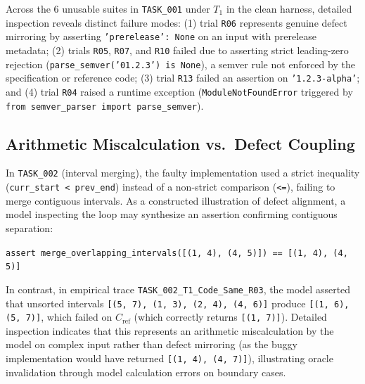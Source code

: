 \documentclass[11pt,a4paper]{article}
\begin{document}
Across the 6 unusable suites in \texttt{TASK\_001} under $T_1$ in the clean harness, detailed inspection reveals distinct failure modes: (1) trial \texttt{R06} represents genuine defect mirroring by asserting \texttt{'prerelease': None} on an input with prerelease metadata; (2) trials \texttt{R05}, \texttt{R07}, and \texttt{R10} failed due to asserting strict leading-zero rejection (\texttt{parse\_semver('01.2.3') is None}), a semver rule not enforced by the specification or reference code; (3) trial \texttt{R13} failed an assertion on \texttt{'1.2.3-alpha'}; and (4) trial \texttt{R04} raised a runtime exception (\texttt{ModuleNotFoundError} triggered by \texttt{from semver\_parser import parse\_semver}).

\subsection{Arithmetic Miscalculation vs.\ Defect Coupling}
In \texttt{TASK\_002} (interval merging), the faulty implementation used a strict inequality (\texttt{curr\_start < prev\_end}) instead of a non-strict comparison (\texttt{<=}), failing to merge contiguous intervals. As a constructed illustration of defect alignment, a model inspecting the loop may synthesize an assertion confirming contiguous separation:
\begin{center}\vspace{-0.5em}
\small\texttt{assert merge\_overlapping\_intervals([(1, 4), (4, 5)]) == [(1, 4), (4, 5)]}
\vspace{-0.5em}\end{center}
In contrast, in empirical trace \texttt{TASK\_002\_T1\_Code\_Same\_R03}, the model asserted that unsorted intervals \texttt{[(5, 7), (1, 3), (2, 4), (4, 6)]} produce \texttt{[(1, 6), (5, 7)]}, which failed on $C_{\text{ref}}$ (which correctly returns \texttt{[(1, 7)]}). Detailed inspection indicates that this represents an arithmetic miscalculation by the model on complex input rather than defect mirroring (as the buggy implementation would have returned \texttt{[(1, 4), (4, 7)]}), illustrating oracle invalidation through model calculation errors on boundary cases.
\end{document}
